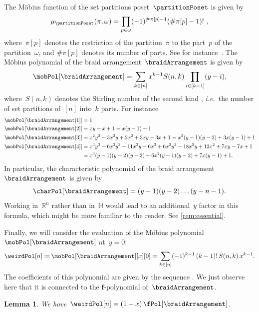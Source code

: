 \documentclass{amsart}
\newtheorem{lemma}[theorem]{Lemma}
\theoremstyle{definition}
\newcommand{\R}{\mathbb{R}} %
\renewcommand{\b}[1]{{\boldsymbol{#1}}} %
\newcommand{\eqdef}{\mbox{\,\raisebox{0.2ex}{\scriptsize\ensuremath{\mathrm:}}\ensuremath{=}\,}} %
\newcommand{\card}[1]{\##1} %
\newcommand{\ie}{\textit{i.e.}~} %
\newcommand{\OEIS}[1]{\cite[{\rm \href{http://oeis.org/#1}{\texttt{#1}}}]{OEIS}}
\renewcommand{\b}[1]{\boldsymbol{#1}} %
\newcommand{\HH}{\mathbb{H}} %
\begin{document}
The M\"obius function of the set partitions poset~$\partitionPoset$ is given by
\[
\mu_{\partitionPoset}(\pi, \omega) = \prod_{p \in \omega} (-1)^{\card{\pi[p]}-1}(\card{\pi[p]}-1)! \ ,
\]
where~$\pi[p]$ denotes the restriction of the partition~$\pi$ to the part~$p$ of the partition~$\omega$, and $\card{\pi[p]}$ denotes its number of parts.
See for instance~\cite{Birkhoff, Rota}.
The M\"obius polynomial of the braid arrangement~$\braidArrangement$ is given by
\[
\mobPol[\braidArrangement] = \sum_{k \in [n]} x^{k-1} S(n,k) \prod_{i \in [k-1]} (y-i) ,
\]
where~$S(n,k)$ denotes the Stirling number of the second kind \OEIS{A008277}, \ie the number of set partitions of~$[n]$ into~$k$ parts.
For instance
\begin{align*}
\mobPol[{\braidArrangement[1]}] & = 1 \\
\mobPol[{\braidArrangement[2]}] & = x y - x + 1 = x (y - 1) + 1 \\
\mobPol[{\braidArrangement[3]}] & = x^2 y^2 - 3 x^2 y + 2 x^2 + 3 x y - 3 x + 1 = x^2 (y - 1) (y - 2) + 3 x (y - 1) + 1\\
\mobPol[{\braidArrangement[4]}] & = x^3 y^3 - 6 x^3 y^2 + 11 x^3 y - 6 x^3 + 6 x^2 y^2 - 18 x^2 y + 12 x^2 + 7 x y - 7 x + 1 \\
& = x^3 (y - 1) (y - 2) (y - 3) + 6 x^2 (y - 1) (y - 2) + 7 x (y - 1) + 1.
\end{align*}
In particular, the characteristic polynomial of the braid arrangement~$\braidArrangement$ is given by
\[
\charPol[\braidArrangement] = (y-1) (y-2) \dots (y-n-1).
\]
Working in~$\R^n$ rather than in~$\HH$ would lead to an additional~$y$ factor in this formula, which might be more familiar to the reader.
See \cref{rem:essential}.

Finally, we will consider the evaluation of the M\"obius polynomial~$\mobPol[\braidArrangement]$ at~$y = 0$:
\[
\weirdPol[n] \eqdef \mobPol[\braidArrangement][x][0] = \sum_{k \in [n]} (-1)^{k-1} \, (k-1)! \, S(n,k) \, x^{k-1}.
\] 
The coefficients of this polynomial are given by the sequence \OEIS{A028246}.
We just observe here that it is connected to the $\b{f}$-polynomial of~$\braidArrangement$.

\begin{lemma}
We have~$\weirdPol[n] = (1-x) \, \fPol[\braidArrangement]$.
\end{lemma}
\end{document}
